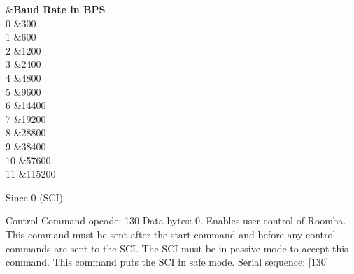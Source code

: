 \begin{Desc}
\begin{description}
\begin{TabularC}{2}
\hline
{}&{\bf Baud Rate in B\+P\+S  }\\
0 &300 \\
1 &600 \\
2 &1200 \\
3 &2400 \\
4 &4800 \\
5 &9600 \\
6 &14400 \\
7 &19200 \\
8 &28800 \\
9 &38400 \\
10 &57600 \\
11 &115200 \\
\end{TabularC}
\begin{DoxySince}{Since}
0 (S\+C\+I) 
\end{DoxySince}
\item[{\em 
\hypertarget{group__roomba-lib_gga305e17dfb7050ad83ea49ded2e6a2e24afc1db2d92cee63105d5591b7c033b65e}{}R\+O\+O\+M\+B\+A\+\_\+\+C\+O\+N\+T\+R\+O\+L\label{group__roomba-lib_gga305e17dfb7050ad83ea49ded2e6a2e24afc1db2d92cee63105d5591b7c033b65e}
}]Control Command opcode\+: 130 Data bytes\+: 0. Enables user control of Roomba. This command must be sent after the start command and before any control commands are sent to the S\+C\+I. The S\+C\+I must be in passive mode to accept this command. This command puts the S\+C\+I in safe mode. Serial sequence\+: \mbox{[}130\mbox{]}


\end{description}
\end{Desc}
